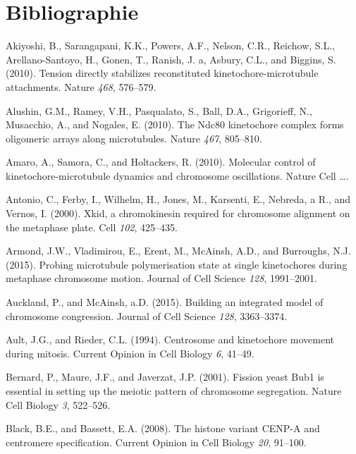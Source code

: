 \documentclass[12pt,a4paper,twoside,openright]{book}
\begin{document}
\clearpage\null

\backmatter

\chapter{Bibliographie}\label{bibliographie}



\hypertarget{refs}{}
\hypertarget{ref-Akiyoshi2010a}{}
Akiyoshi, B., Sarangapani, K.K., Powers, A.F., Nelson, C.R., Reichow,
S.L., Arellano-Santoyo, H., Gonen, T., Ranish, J. a, Asbury, C.L., and
Biggins, S. (2010). Tension directly stabilizes reconstituted
kinetochore-microtubule attachments. Nature \emph{468}, 576--579.

\hypertarget{ref-Alushin2010}{}
Alushin, G.M., Ramey, V.H., Pasqualato, S., Ball, D.A., Grigorieff, N.,
Musacchio, A., and Nogales, E. (2010). The Ndc80 kinetochore complex
forms oligomeric arrays along microtubules. Nature \emph{467}, 805--810.

\hypertarget{ref-Amaro2010a}{}
Amaro, A., Samora, C., and Holtackers, R. (2010). Molecular control of
kinetochore-microtubule dynamics and chromosome oscillations. Nature
Cell \ldots{}.

\hypertarget{ref-Antonio2000a}{}
Antonio, C., Ferby, I., Wilhelm, H., Jones, M., Karsenti, E., Nebreda, a
R., and Vernos, I. (2000). Xkid, a chromokinesin required for chromosome
alignment on the metaphase plate. Cell \emph{102}, 425--435.

\hypertarget{ref-Armond2015}{}
Armond, J.W., Vladimirou, E., Erent, M., McAinsh, A.D., and Burroughs,
N.J. (2015). Probing microtubule polymerisation state at single
kinetochores during metaphase chromosome motion. Journal of Cell Science
\emph{128}, 1991--2001.

\hypertarget{ref-Auckland2015a}{}
Auckland, P., and McAinsh, a.D. (2015). Building an integrated model of
chromosome congression. Journal of Cell Science \emph{128}, 3363--3374.

\hypertarget{ref-Ault1994}{}
Ault, J.G., and Rieder, C.L. (1994). Centrosome and kinetochore movement
during mitosis. Current Opinion in Cell Biology \emph{6}, 41--49.

\hypertarget{ref-Bernard2001}{}
Bernard, P., Maure, J.F., and Javerzat, J.P. (2001). Fission yeast Bub1
is essential in setting up the meiotic pattern of chromosome
segregation. Nature Cell Biology \emph{3}, 522--526.

\hypertarget{ref-Black2008}{}
Black, B.E., and Bassett, E.A. (2008). The histone variant CENP-A and
centromere specification. Current Opinion in Cell Biology \emph{20},
91--100.
\end{document}
